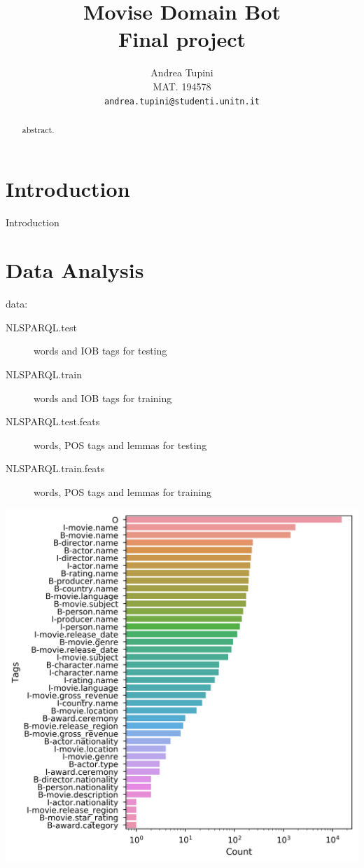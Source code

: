 \documentclass[11pt,a4paper]{article}
\title{Movise Domain Bot \\ Final project}
\author{Andrea Tupini \\
  MAT.  194578 \\
  {\tt andrea.tupini@studenti.unitn.it}}
\date{}
\begin{document}
	
\maketitle

\begin{abstract}
	
	abstract. 
	\\
	
\end{abstract} 

\section{Introduction}

Introduction

	
\section{Data Analysis}
\label{sec-data-analysis}

	data:
	
	\begin{description}
		\item[NLSPARQL.test] words and IOB tags for testing
		\item[NLSPARQL.train] words and IOB tags for training              
		\item[NLSPARQL.test.feats] words, POS tags and lemmas for testing
		\item[NLSPARQL.train.feats] words, POS tags and lemmas for training
	\end{description}

	
	\hspace*{-0.4cm}\includegraphics[scale=0.5]{barplot_iob_tag_counts}
\end{document}
